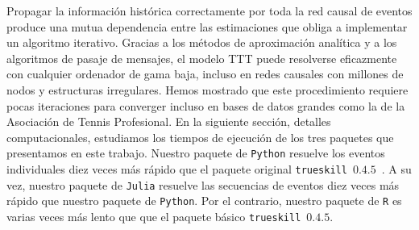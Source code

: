 \documentclass[a4paper,11pt]{book}
\theoremstyle{definition}
\begin{document}
Propagar la informaci\'on hist\'orica correctamente por toda la red causal de eventos produce una mutua dependencia entre las estimaciones que obliga a implementar un algoritmo iterativo.
%
Gracias a los m\'etodos de aproximaci\'on anal\'itica y a los algoritmos de pasaje de mensajes, el modelo TTT puede resolverse eficazmente con cualquier ordenador de gama baja, incluso en redes causales con millones de nodos y estructuras irregulares.
%
Hemos mostrado que este procedimiento requiere pocas iteraciones para converger incluso en bases de datos grandes como la de la Asociaci\'on de Tennis Profesional.
%
En la siguiente secci\'on, detalles computacionales, estudiamos los tiempos de ejecuci\'on de los tres paquetes que presentamos en este trabajo.
%
Nuestro paquete de \texttt{Python} resuelve los eventos individuales diez veces m\'as r\'apido que el paquete original \texttt{trueskill}~$0.4.5$~\cite{Lee2012}.
%
A su vez, nuestro paquete de \texttt{Julia} resuelve las secuencias de eventos diez veces m\'as r\'apido  que nuestro paquete de \texttt{Python}.
%
Por el contrario, nuestro paquete de \texttt{R} es varias veces m\'as lento que que el paquete b\'asico \texttt{trueskill}~$0.4.5$.
\end{document}
